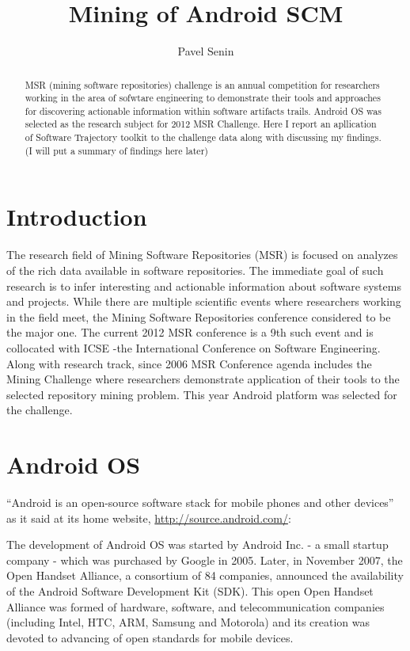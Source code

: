 \documentclass[a4paper,10pt]{article}
\numberwithin{equation}{subsection}
\begin{document}
\title{Mining of Android SCM}
\author{Pavel Senin}

\maketitle

\begin{abstract}
MSR (mining software repositories) challenge is an annual competition for researchers working in the area of
sofwtare engineering to demonstrate their tools and approaches for discovering actionable information within
software artifacts trails. Android OS was selected as the research subject for 2012 MSR Challenge. 
Here I report an apllication of Software Trajectory toolkit to the challenge data along with discussing my findings.
(I will put a summary of findings here later)
\end{abstract}

\section{Introduction}
The research field of Mining Software Repositories (MSR) is focused on analyzes of the rich 
data available in software repositories. The immediate goal of such research is to infer interesting 
and actionable information about software systems and projects. While there are multiple scientific 
events where researchers working in the field meet, the Mining Software Repositories 
conference considered to be the major one. The current 2012 MSR conference is a 9th such event
and is collocated with ICSE -the International Conference on Software Engineering.
Along with research track, since 2006 MSR Conference agenda includes the Mining Challenge where 
researchers demonstrate application of their tools to the selected repository mining problem. This
year Android platform was selected for the challenge.

\section{Android OS}
``Android is an open-source software stack for mobile phones and other devices'' as it said 
at its home website, \url{http://source.android.com/}: 

The development of Android OS was started by Android Inc. - a small startup company - which was purchased by Google 
in 2005. Later, in November 2007, the Open Handset Alliance, a consortium of 84 companies, announced 
the availability of the Android Software Development Kit (SDK). This open Open Handset Alliance was formed 
of hardware, software, and telecommunication companies (including Intel, HTC, ARM, Samsung and Motorola)
and its creation was devoted to advancing of open standards for mobile devices. 
\end{document}
